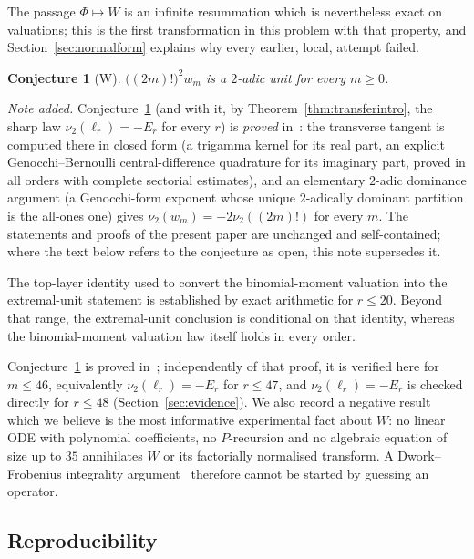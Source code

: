 \documentclass[12pt]{amsart}
\newtheorem{conjecture}[theorem]{Conjecture}
\theoremstyle{definition}
\theoremstyle{remark}
\begin{document}
The passage $\Phi\mapsto W$ is an infinite resummation which is nevertheless exact on valuations; this is the first transformation in this problem with that property, and Section~\ref{sec:normalform} explains why every earlier, local, attempt failed.

\begin{conjecture}[W]\label{conj:W}
$\bigl((2m)!\bigr)^2w_m$ is a $2$-adic unit for every $m\ge0$.
\end{conjecture}

\medskip\noindent\emph{Note added.}  Conjecture~\ref{conj:W} (and with it, by Theorem~\ref{thm:transferintro}, the sharp law $\nu_2(\ell_r)=-E_r$ for every $r$) is \emph{proved} in~\cite{Ultraspherical}: the transverse tangent is computed there in closed form (a trigamma kernel for its real part, an explicit Genocchi--Bernoulli central-difference quadrature for its imaginary part, proved in all orders with complete sectorial estimates), and an elementary $2$-adic dominance argument  (a Genocchi-form exponent whose unique $2$-adically dominant partition is the all-ones one) gives $\nu_2(w_m)=-2\nu_2((2m)!)$ for every $m$.  The statements and proofs of the present paper are unchanged and self-contained; where the text below refers to the conjecture as open, this note supersedes it.

The top-layer identity used to convert the binomial-moment valuation into the extremal-unit statement is established by exact arithmetic for $r\le20$. Beyond that range, the extremal-unit conclusion is conditional on that identity, whereas the binomial-moment valuation law itself holds in every order.

Conjecture~\ref{conj:W} is proved in~\cite{Ultraspherical}; independently of that proof, it is verified here for $m\le46$, equivalently $\nu_2(\ell_r)=-E_r$ for $r\le47$, and $\nu_2(\ell_r)=-E_r$ is checked directly for $r\le48$ (Section~\ref{sec:evidence}).  We also record a negative result which we believe is the most informative experimental fact about $W$: no linear ODE with polynomial coefficients, no $P$-recursion and no algebraic equation of size up to $35$ annihilates $W$ or its factorially normalised transform.  A Dwork--Frobenius integrality argument~\cite{Dwork,Nemoto}  therefore cannot be started by guessing an operator.

\subsection{Reproducibility}
\end{document}
